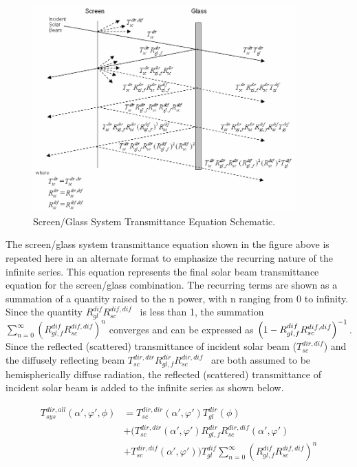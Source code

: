 \begin{figure}[hbtp] %
\centering
\includegraphics[width=0.9\textwidth, height=0.9\textheight, keepaspectratio=true]{media/image1231.png}
\caption{Screen/Glass System Transmittance Equation Schematic. \protect \label{fig:screenglass-system-transmittance-equation}}
\end{figure}

The screen/glass system transmittance equation shown in the figure above is repeated here in an alternate format to emphasize the recurring nature of the infinite series. This equation represents the final solar beam transmittance equation for the screen/glass combination. The recurring terms are shown as a summation of a quantity raised to the n power, with n ranging from 0 to infinity. Since the quantity \(R_{gl}^{dif}R_{sc}^{dif,dif}\) ~is less than 1, the summation \(\sum\limits_{n = 0}^\infty {{{(R_{gl,f}^{dif}R_{sc}^{dif,dif})}^n}}\) converges and can be expressed as $\PB{1-R_{gl,f}^{dif}R_{sc}^{dif,dif}}^{-1}$.  Since the reflected (scattered) transmittance of incident solar beam (\(T_{sc}^{dir,dif}\)) and the diffusely reflecting beam \(T_{sc}^{dir,dir}R_{gl,f}^{dir}R_{sc}^{dir,dif}\) ~are both assumed to be hemispherically diffuse radiation, the reflected (scattered) transmittance of incident solar beam is added to the infinite series as shown below.

\begin{equation}
\begin{array}{rl}
  T_{sys}^{dir,all}(\alpha ',\varphi ',\phi ) &= T_{sc}^{dir,dir}(\alpha ',\varphi ')T_{gl}^{dir}\left( \phi  \right) \\
                                              &+ (T_{sc}^{dir,dir}(\alpha ',\varphi ')R_{gl,f}^{dir}R_{sc}^{dir,dif}(\alpha ',\varphi ') \\
                                              &+ T_{sc}^{dir,dif}(\alpha ',\varphi '))T_{gl}^{dif}\sum\limits_{n = 0}^\infty  {{{(R_{gl,f}^{dif}R_{sc}^{dif,dif})}^n}}
\end{array}
\end{equation}

